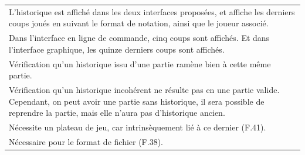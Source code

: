 \documentclass[a4paper,12pt]{article}
\begin{document}
\begin{tabularx}{\textwidth}{|X|}
    L'historique est affiché dans les deux interfaces proposées, et affiche les derniers coups joués en suivant le format de notation, ainsi que le joueur associé.                                                                                                                                                                                                                                                             \\
    Dans l’interface en ligne de commande, cinq coups sont affichés. Et dans l’interface graphique, les quinze derniers coups sont affichés.                                                                                                                                                                                                                                                                                    \\
    \arrayrulecolor{MediumAquamarine}\hline
    \arrayrulecolor{CornflowerBlue}
    Vérification qu’un historique issu d’une partie ramène bien à cette même partie.                                                                                                                                                                                                                                                                                                                                            \\
    Vérification qu’un historique incohérent ne résulte pas en une partie valide. Cependant, on peut avoir une partie sans historique, il sera possible de reprendre la partie, mais elle n’aura pas d’historique ancien.                                                                                                                                                                                                       \\
    \arrayrulecolor{MediumAquamarine}\hline
    \arrayrulecolor{CornflowerBlue}
    Nécessite un plateau de jeu, car intrinsèquement lié à ce dernier (F.41).                                                                                                                                                                                                                                                                                                                                                   \\
    Nécessaire pour le format de fichier (F.38).                                                                                                                                                                                                                                                                                                                                                                                \\
    \hline
\end{tabularx}
\end{document}
